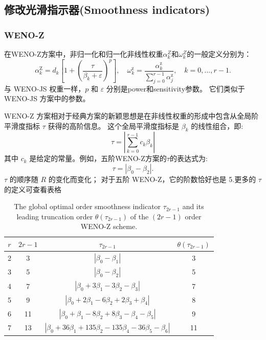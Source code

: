 \documentclass{book}
\begin{document}
\subsection{修改光滑指示器(Smoothness indicators)}
\subsubsection{WENO-Z}
在WENO-Z方案中，非归一化和归一化非线性权重$\alpha_{k}^{Z}$和$\omega_{k}^{Z}$的一般定义分别为：
\begin{equation}
    \alpha_{k}^{\mathrm{Z}}=d_{k}\left[1+\left(\frac{\tau}{\beta_{k}+\varepsilon}\right)^{p}\right], \quad \omega_{k}^{\mathrm{z}}=\frac{\alpha_{k}^{\mathrm{z}}}{\sum_{j=0}^{r-1} \alpha_{j}^{\mathrm{z}}}, \quad k=0, \ldots, r-1 .
\end{equation}
与 WENO-JS 权重一样，$p$ 和 $\varepsilon$ 分别是power和sensitivity参数。 它们类似于 WENO-JS 方案中的参数。

WENO-Z 方案相对于经典方案的新颖思想是在非线性权重的形成中包含从全局阶平滑度指标 $\tau$ 获得的高阶信息。 这个全局平滑度指标是 $\beta_{k}$ 的线性组合，即:
\begin{equation}
    \tau=\left|\sum_{k=0}^{r-1} c_{k} \beta_{k}\right|
\end{equation}
其中 $c_{k}$ 是给定的常量。例如，五阶WENO-Z方案的$\tau$的表达式为:
\begin{equation}
    \tau=\left|\beta_{0}-\beta_{2}\right| .
\end{equation}
$\tau$ 的顺序随 $R$ 的变化而变化； 对于五阶 WENO-Z，它的阶数恰好也是 5.更多的 $\tau$ 的定义可查看表格\cite{WENO-Z-2013}
\begin{table}[htbp]
    \centering
    \label{table:tau_ref}
    \caption{The global optimal order smoothness indicator  $\tau_{2 r-1}$  and its leading truncation order  $\theta\left(\tau_{2 r-1}\right)$  of the  $(2 r-1)$  order WENO-Z scheme.}
    \begin{tabular}{cccc}
        \toprule
        $r$ & $2r-1$ & $\tau_{2r-1}$                                                 & $\theta(\tau_{2r-1})$ \\
        \midrule
        2   & 3      & $|\beta_0-\beta_1|$                                           & 3                     \\
        3   & 5      & $|\beta_0-\beta_2|$                                           & 5                     \\
        4   & 7      & $|\beta_0+3\beta_1-3\beta_2-\beta_3|$                         & 7                     \\
        5   & 9      & $|\beta_0+2\beta_1-6\beta_2+2\beta_3+\beta_4|$                & 8                     \\
        6   & 11     & $|\beta_0+\beta_1-8\beta_2+8\beta_3-\beta_4-\beta_5|$         & 9                     \\
        7   & 13     & $|\beta_0+36\beta_1+135\beta_2-135\beta_4-36\beta_5-\beta_6|$ & 11                    \\
        \bottomrule
    \end{tabular}
\end{table}
\end{document}
